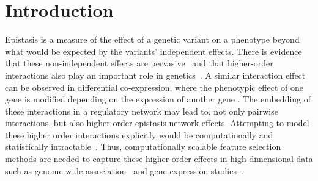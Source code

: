\documentclass[10pt]{article}
\begin{document}
\begin{abstract}
\\

\end{abstract}

\linenumbers

\section{Introduction}

Epistasis is a measure of the effect of a genetic variant on a phenotype beyond what would be expected by the variants' independent effects. There is evidence that these non-independent effects are pervasive~\cite{breen12} and that higher-order interactions also play an important role in genetics~\cite{weinreich13}. 
A similar interaction effect can be observed in differential co-expression, where the phenotypic effect of one gene is modified depending on the expression of another gene \cite{lareau15,diffcoexp10}.
The embedding of these interactions in a regulatory network may lead to, not only pairwise interactions, but also higher-order epistasis network effects. Attempting to model these higher order interactions explicitly would be computationally and statistically intractable~\cite{riesselman18}.
Thus, computationally scalable feature selection methods are needed to capture these higher-order effects in high-dimensional data such as genome-wide association~\cite{titv} and gene expression studies~\cite{stir}.
\end{document}
